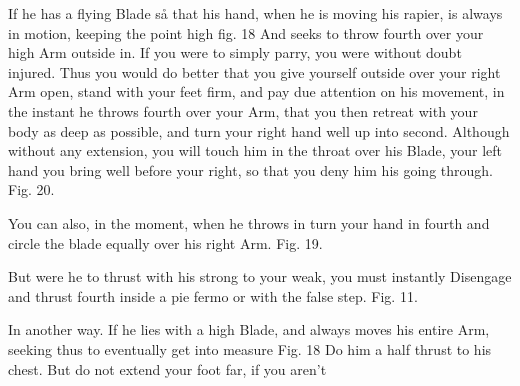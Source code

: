 \exercise{}


If he has a flying Blade så that his hand, when he is moving his rapier, is always in motion, keeping the point high fig. 18 And seeks to throw fourth over your high Arm outside in. If you were to simply parry, you were without doubt injured. Thus you would do better that you give yourself outside over your right Arm open, stand with your feet firm, and pay due attention on his movement, in the instant he throws fourth over your Arm, that you then retreat with your body as deep as possible, and turn your right hand well up into second. Although without any extension, you will touch him in the throat over his Blade, your left hand you bring well before your right, so that you deny him his going through. Fig. 20.

\exercise{}


You can also, in the moment, when he throws in turn your hand in fourth and circle the blade equally over his right Arm. Fig. 19.

\exercise{}


But were he to thrust with his strong to your weak, you must instantly Disengage and thrust fourth inside a pie fermo or with the false step. Fig. 11.
\exercise{}


In another way. If he lies with a high Blade, and always moves his entire Arm, seeking thus to eventually get into measure Fig. 18 Do him a half thrust to his chest. But do not extend your foot far, if you aren't

